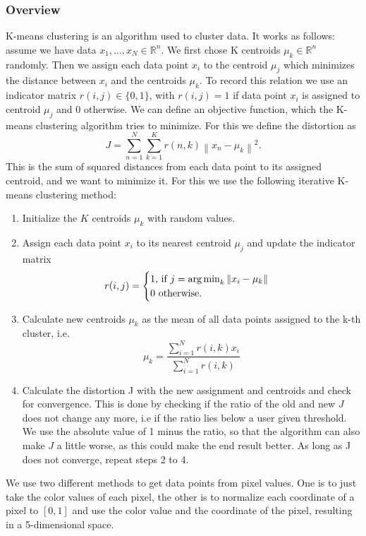 \subsubsection{Overview}
K-means clustering is an algorithm used to cluster data. It works as follows: assume we have data $x_1,\ldots,x_N \in \mathbb{R}^n$. We first chose K centroids $\mu_k \in \mathbb{R}^n$ randomly. Then we assign each data point $x_i$ to the centroid $\mu_j$ which minimizes the distance between $x_i$ and the centroids $\mu_k$. To record this relation we use an indicator matrix $r(i,j) \in \{0,1\}$, with $r(i,j)=1$ if data point $x_i$ is assigned to centroid $\mu_j$ and $0$ otherwise. We can define an objective function, which the K-means clustering algorithm tries to minimize. For this we define the distortion as
\begin{equation}
	J = \sum_{n=1}^{N} \sum_{k=1}^{K} r(n,k) \left\|x_n-\mu_k\right\|^2.
\end{equation}
This is the sum of squared distances from each data point to its assigned centroid, and we want to minimize it. For this we use the following iterative K-means clustering method:
\begin{enumerate}
\item Initialize the $K$ centroids $\mu_k$ with random values.
\item Assign each data point $x_i$ to its nearest centroid $\mu_j$ and update the indicator matrix
\[
	r(i,j)= \begin{cases}
               1 \text{, if } j = \operatorname*{arg\,min}_k\left\|x_i-\mu_k\right\| \\

             0 \text{ otherwise.}
            \end{cases}
\]
\item Calculate new centroids $\mu_k$ as the mean of all data points assigned to the k-th cluster, i.e. 
\[
	\mu_k = \frac{\sum\limits_{i=1}^N r(i,k) x_i}{\sum\limits_{i=1}^N r(i,k)}
\]
\item Calculate the distortion J with the new assignment and centroids and check for convergence. This is done by checking if the ratio of the old and new $J$ does not change any more, i.e if the ratio lies below a user given threshold. We use the absolute value of 1 minus the ratio, so that the algorithm can also make $J$ a little worse, as this could make the end result better. As long as J does not converge, repeat steps 2 to 4.
\end{enumerate} 

We use two different methods to get data points from pixel values. One is to just take the color values of each pixel, the other is to normalize each coordinate of a pixel to $[0, 1]$ and use the color value and the coordinate of the pixel, resulting in a 5-dimensional space.

